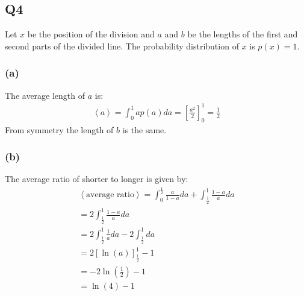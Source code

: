 \documentclass[../main.tex]{subfiles}
\begin{document}
\subsection{Q4}
Let $x$ be the position of the division and $a$ and $b$ be the lengths of the first and second parts of the divided line. The probability distribution of $x$ is $p(x)=1$.
\subsubsection*{(a)}
The average length of $a$ is:
\begin{align*}
	\left<a\right> = \int_0^1a p(a)da = \left[\frac{a^2}{2}\right]^1_0 = \frac{1}{2}
\end{align*}
From symmetry the length of $b$ is the same.
\subsubsection*{(b)}
The average ratio of shorter to longer is given by:
\begin{align*}
	\left<\text{average ratio}\right> = \int_0^{\frac{1}{2}} \frac{a}{1-a}da + \int_{\frac{1}{2}}^1\frac{1-a}{a}da\\
	=2\int_{\frac{1}{2}}^1\frac{1-a}{a}da\\
	=2\int_{\frac{1}{2}}^1\frac{1}{a}da - 2\int_{\frac{1}{2}}^1da \\
	=2\left[\ln\left(a\right)\right]_{\frac{1}{2}}^1 - 1 \\
	=-2\ln\left(\frac{1}{2}\right)-1\\
	=\ln(4)-1
\end{align*}
\end{document}
